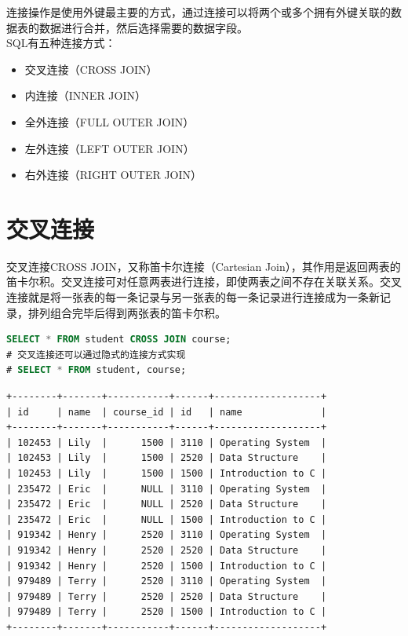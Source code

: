 \documentclass[12pt, openany, oneside]{book}
\begin{document}
连接操作是使用外键最主要的方式，通过连接可以将两个或多个拥有外键关联的数据表的数据进行合并，然后选择需要的数据字段。\\

SQL有五种连接方式：

\begin{itemize}
	\item 交叉连接（CROSS JOIN）
	\item 内连接（INNER JOIN）
	\item 全外连接（FULL OUTER JOIN）
	\item 左外连接（LEFT OUTER JOIN）
	\item 右外连接（RIGHT OUTER JOIN）
\end{itemize}

\vspace{0.5cm}

\section{交叉连接}

交叉连接CROSS JOIN，又称笛卡尔连接（Cartesian Join），其作用是返回两表的笛卡尔积。交叉连接可对任意两表进行连接，即使两表之间不存在关联关系。交叉连接就是将一张表的每一条记录与另一张表的每一条记录进行连接成为一条新记录，排列组合完毕后得到两张表的笛卡尔积。\\


\begin{lstlisting}[language=SQL]
SELECT * FROM student CROSS JOIN course;
# 交叉连接还可以通过隐式的连接方式实现
# SELECT * FROM student, course;
\end{lstlisting}

\begin{tcolorbox}
\begin{verbatim}
+--------+-------+-----------+------+-------------------+
| id     | name  | course_id | id   | name              |
+--------+-------+-----------+------+-------------------+
| 102453 | Lily  |      1500 | 3110 | Operating System  |
| 102453 | Lily  |      1500 | 2520 | Data Structure    |
| 102453 | Lily  |      1500 | 1500 | Introduction to C |
| 235472 | Eric  |      NULL | 3110 | Operating System  |
| 235472 | Eric  |      NULL | 2520 | Data Structure    |
| 235472 | Eric  |      NULL | 1500 | Introduction to C |
| 919342 | Henry |      2520 | 3110 | Operating System  |
| 919342 | Henry |      2520 | 2520 | Data Structure    |
| 919342 | Henry |      2520 | 1500 | Introduction to C |
| 979489 | Terry |      2520 | 3110 | Operating System  |
| 979489 | Terry |      2520 | 2520 | Data Structure    |
| 979489 | Terry |      2520 | 1500 | Introduction to C |
+--------+-------+-----------+------+-------------------+
	\end{verbatim}
\end{tcolorbox}
\end{document}
